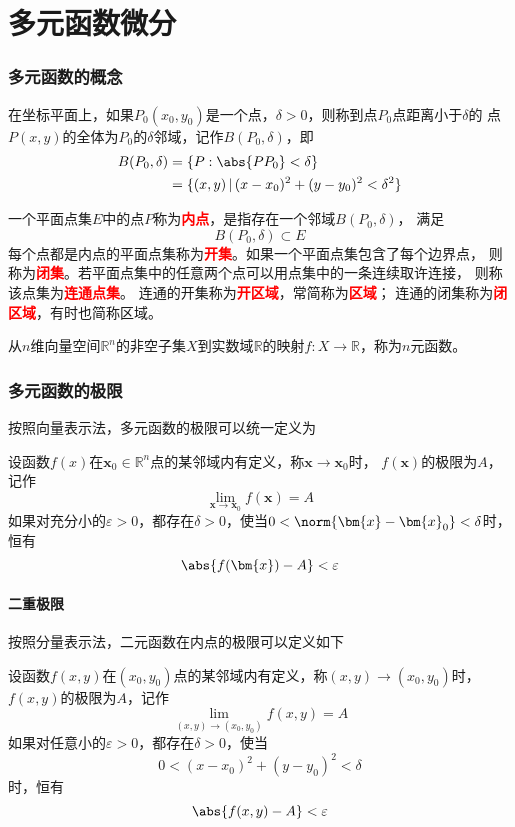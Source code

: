 \part{多元函数微分}
\section{多元函数的概念}
在坐标平面上，如果$P_0(x_0,y_0)$是一个点，$\delta > 0$，则称到点$P_0$点距离小于$\delta$的
点$P(x,y)$的全体为$P_0$的$\delta$邻域，记作$B(P_0,\delta)$，即
\begin{align*}
    B(P_0,\delta) & = \{P:\abs{PP_0}<\delta\}                          \\
                  & = \{(x,y)\,|\, (x-x_0)^2 + (y-y_0)^2 < \delta^2 \}
\end{align*}

一个平面点集$E$中的点$P$称为\textcolor{red}{\textbf{\textsf{内点}}}，是指存在一个邻域$B(P_0,\delta)$，
满足
\[ B(P_0,\delta) \subset E \]
每个点都是内点的平面点集称为\textcolor{red}{\textbf{\textsf{开集}}}。如果一个平面点集包含了每个边界点，
则称为\textcolor{red}{\textbf{\textsf{闭集}}}。若平面点集中的任意两个点可以用点集中的一条连续取许连接，
则称该点集为\textcolor{red}{\textbf{\textsf{连通点集}}}。
连通的开集称为\textcolor{red}{\textbf{\textsf{开区域}}}，常简称为\textcolor{red}{\textbf{\textsf{区域}}}；
连通的闭集称为\textcolor{red}{\textbf{\textsf{闭区域}}}，有时也简称区域。

从$n$维向量空间$\mathbb{R}^n$的非空子集$X$到实数域$\mathbb{R}$的映射$f:X\to \mathbb{R}$，称为$n$元函数。

\section{多元函数的极限}
按照向量表示法，多元函数的极限可以统一定义为
\begin{definition}
    设函数$f(x)$在$\bm{x}_0\in\mathbb{R}^n$点的某邻域内有定义，称$\bm{x}\to\bm{x}_0$时，
    $f(\bm{x})$的极限为$A$，记作
    \[ \lim_{\bm{x}\to\bm{x}_0}f(\bm{x})=A \]
    如果对充分小的$\varepsilon>0$，都存在$\delta>0$，使当$0<\norm{\bm{x}-\bm{x}_0}<\delta$时，恒有
    \[ \abs{f(\bm{x})-A}<\varepsilon \]
\end{definition}

\subsection{二重极限}
按照分量表示法，二元函数在内点的极限可以定义如下
\begin{definition}
    设函数$f(x,y)$在$(x_0,y_0)$点的某邻域内有定义，称$(x,y)\to(x_0,y_0)$时，$f(x,y)$的极限为$A$，记作
    \[ \lim_{(x,y)\to(x_0,y_0)} f(x,y) = A \]
    如果对任意小的$\varepsilon>0$，都存在$\delta>0$，使当
    \[ 0<(x-x_0)^2 +(y-y_0)^2<\delta \]
    时，恒有
    \[ \abs{f(x,y)-A} < \varepsilon \]
\end{definition}

